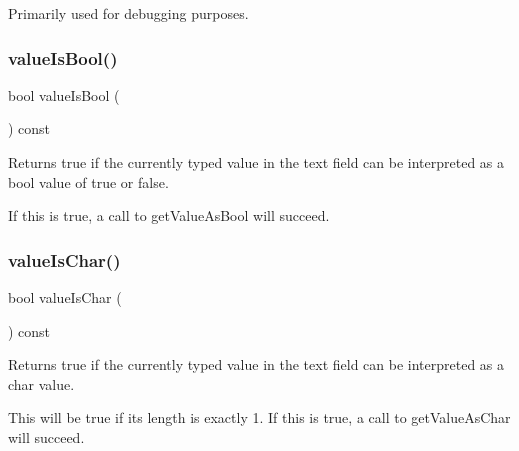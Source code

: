 Primarily used for debugging purposes. \mbox{\label{classsgl_1_1GTextField_a203f90275053ab957b1ea5a40dc3dd1e}} 
\subsubsection{\texorpdfstring{value\+Is\+Bool()}{valueIsBool()}}
{\footnotesize\ttfamily bool value\+Is\+Bool (\begin{DoxyParamCaption}{ }\end{DoxyParamCaption}) const\hspace{0.3cm}{\ttfamily [virtual]}}



Returns true if the currently typed value in the text field can be interpreted as a bool value of true or false. 

If this is true, a call to get\+Value\+As\+Bool will succeed. \mbox{\label{classsgl_1_1GTextField_ac7a337b1e4c2f752a7f3fb634c92b442}} 
\subsubsection{\texorpdfstring{value\+Is\+Char()}{valueIsChar()}}
{\footnotesize\ttfamily bool value\+Is\+Char (\begin{DoxyParamCaption}{ }\end{DoxyParamCaption}) const\hspace{0.3cm}{\ttfamily [virtual]}}



Returns true if the currently typed value in the text field can be interpreted as a char value. 

This will be true if its length is exactly 1. If this is true, a call to get\+Value\+As\+Char will succeed. \mbox{\label{classsgl_1_1GTextField_aa80caadc7498333f74a08b4cdc0528c1}} 
